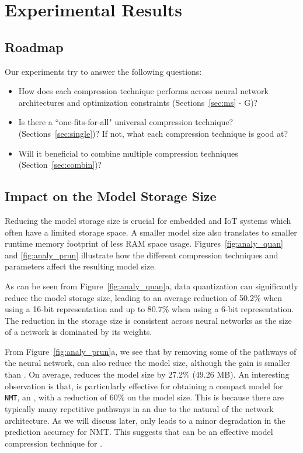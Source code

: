 \section{Experimental Results}


\subsection{Roadmap}
Our experiments try to answer the following questions:

\begin{itemize}
\item How does each compression technique performs across neural network architectures and optimization constraints
    (Sections~\ref{sec:ms} - G)?
\item Is there a ``one-fits-for-all" universal compression technique? (Sections~\ref{sec:single})? If not, what each compression
    technique is good at?
\item Will it beneficial to combine multiple compression techniques (Section~\ref{sec:combin})?
\end{itemize}

\subsection{Impact on the Model Storage Size\label{sec:ms}}
Reducing the model storage size is crucial for embedded and IoT systems which often have a limited storage space. A smaller model size also
translates to smaller runtime memory footprint of less RAM space usage. Figures~\ref{fig:analy_quan} and  \ref{fig:analy_prun} illustrate
how the different compression techniques and parameters affect the resulting model size.

As can be seen from Figure~\ref{fig:analy_quan}a, data quantization can significantly reduce the model storage size, leading to an average
reduction of 50.2\% when using a 16-bit representation and up to 80.7\% when using a 6-bit representation. The reduction in the storage
size is consistent across neural networks as the size of a network is dominated by its weights.

From Figure~\ref{fig:analy_prun}a, we see that by removing some of the pathways of the neural network, \pruning can also reduce the model
size, although the gain is smaller than \quantization. On average, \pruning reduces the model size by 27.2\% (49.26 MB). An interesting
observation is that, \pruning is particularly effective for obtaining a compact model for \texttt{NMT}, an \RNN, with a reduction of 60\%
on the model size. This is because there are typically many repetitive pathways in an \RNN due to the natural of the network architecture.
As we will discuss later, \pruning only leads to a minor degradation in the prediction accuracy for NMT. This suggests that \pruning can be
an effective model compression technique for \RNNs.



